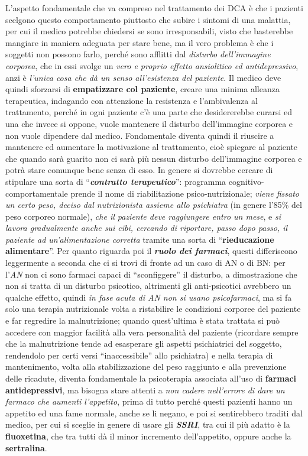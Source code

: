 \documentclass[]{article}
\begin{document}
L'aspetto fondamentale che va compreso nel trattamento dei DCA è che i
pazienti scelgono questo comportamento piuttosto che subire i sintomi di
una malattia, per cui il medico potrebbe chiedersi se sono
irresponsabili, visto che basterebbe mangiare in maniera adeguata per
stare bene, ma il vero problema è che i soggetti non possono farlo,
perché sono afflitti dal \emph{disturbo dell'immagine corporea}, che in
essi svolge un \emph{vero e proprio effetto ansiolitico ed
antidepressivo}, anzi è \emph{l'unica cosa che dà un senso all'esistenza
del paziente}. Il medico deve quindi sforzarsi di \textbf{empatizzare
col paziente}, creare una minima alleanza terapeutica, indagando con
attenzione la resistenza e l'ambivalenza al trattamento, perché in ogni
paziente c'è una parte che desidererebbe curarsi ed una che invece si
oppone, vuole mantenere il disturbo dell'immagine corporea e non vuole
dipendere dal medico. Fondamentale diventa quindi il riuscire a
mantenere ed aumentare la motivazione al trattamento, cioè spiegare al
paziente che quando sarà guarito non ci sarà più nessun disturbo
dell'immagine corporea e potrà stare comunque bene senza di esso. In
genere si dovrebbe cercare di stipulare una sorta di
``\textbf{\emph{contratto terapeutico}}'': programma
cognitivo-comportamentale prende il nome di riabilitazione
psico-nutrizionale; \emph{viene fissato un certo peso, deciso dal
nutrizionista assieme allo psichiatra} (in genere l'85\% del peso
corporeo normale), \emph{che il paziente deve raggiungere entro un
mese}, e \emph{si lavora gradualmente anche sui cibi, cercando di
riportare, passo dopo passo, il paziente ad un'alimentazione corretta}
tramite una sorta di ``\textbf{rieducazione alimentare}''. Per quanto
riguarda poi il \textbf{\emph{ruolo dei farmaci}}, questi differiscono
leggermente a seconda che ci si trovi di fronte ad un caso di AN o di
BN: per l'\emph{AN} non ci sono farmaci capaci di ``sconfiggere'' il
disturbo, a dimostrazione che non si tratta di un disturbo psicotico,
altrimenti gli anti-psicotici avrebbero un qualche effetto, quindi
\emph{in fase acuta di AN non si usano psicofarmaci}, ma si fa solo una
terapia nutrizionale volta a ristabilire le condizioni corporee del
paziente e far regredire la malnutrizione; quando quest'ultima è stata
trattata si può accedere con maggior facilità alla vera personalità del
paziente (ricordare sempre che la malnutrizione tende ad esasperare gli
aspetti psichiatrici del soggetto, rendendolo per certi versi
``inaccessibile'' allo psichiatra) e nella terapia di mantenimento,
volta alla stabilizzazione del peso raggiunto e alla prevenzione delle
ricadute, diventa fondamentale la psicoterapia associata all'uso di
\textbf{farmaci antidepressivi}, ma bisogna stare attenti a \emph{non
cadere nell'errore di dare un farmaco che aumenti l'appetito}, prima di
tutto perché questi pazienti hanno un appetito ed una fame normale,
anche se li negano, e poi si sentirebbero traditi dal medico, per cui si
sceglie in genere di usare gli \textbf{\emph{SSRI}}, tra cui il più
adatto è la \textbf{fluoxetina}, che tra tutti dà il minor incremento
dell'appetito, oppure anche la \textbf{sertralina}.
\end{document}

